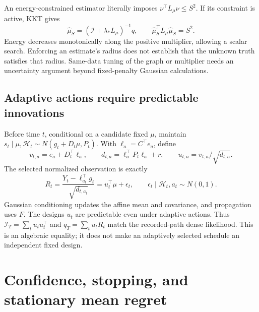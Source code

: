 An energy-constrained estimator literally imposes $\nu^\top L_\mu\nu\le S^2$. If its constraint is active, KKT gives
\begin{equation}
\widehat\mu_S=(\mathcal I+\lambda_*L_\mu)^{-1}q,
\qquad \widehat\mu_S^\top L_\mu\widehat\mu_S=S^2.
\end{equation}
Energy decreases monotonically along the positive multiplier, allowing a scalar search. Enforcing an estimate's radius does not establish that the unknown truth satisfies that radius. Same-data tuning of the graph or multiplier needs an uncertainty argument beyond fixed-penalty Gaussian calculations.

\subsection{Adaptive actions require predictable innovations}
Before time $t$, conditional on a candidate fixed $\mu$, maintain
$s_t\mid\mu,\mathcal H_t\sim N(g_t+D_t\mu,P_t)$. With $\ell_a=C^\top e_a$, define
\begin{equation}
v_{t,a}=e_a+D_t^\top\ell_a,\qquad d_{t,a}=\ell_a^\top P_t\ell_a+r,\qquad u_{t,a}=v_{t,a}/\sqrt{d_{t,a}}.
\end{equation}
The selected normalized observation is exactly
\begin{equation}
R_t=\frac{Y_t-\ell_{a_t}^\top g_t}{\sqrt{d_{t,a_t}}}
=u_t^\top\mu+\epsilon_t,\qquad \epsilon_t\mid\mathcal H_t,a_t\sim N(0,1).
\label{eq:maininnovation}
\end{equation}
Gaussian conditioning updates the affine mean and covariance, and propagation uses $F$. The designs $u_t$ are predictable even under adaptive actions. Thus
$\mathcal I_T=\sum_tu_tu_t^\top$ and $q_T=\sum_tu_tR_t$ match the recorded-path dense likelihood. This is an algebraic equality; it does not make an adaptively selected schedule an independent fixed design.

\section{Confidence, stopping, and stationary mean regret}

